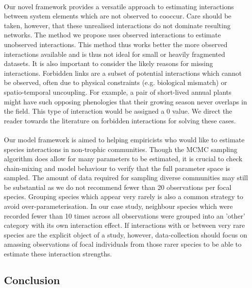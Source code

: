 \documentclass[a4,12pt]{article}
\begin{document}
        \paragraph{}
        Our novel framework provides a versatile approach to estimating interactions between system elements which are not observed to cooccur. Care should be taken, however, that these unrealised interactions do not dominate resulting networks. The method we propose uses observed interactions to estimate unobserved interactions. This method thus works better the more observed interactions available and is thus not ideal for small or heavily fragmented datasets. It is also important to consider the likely reasons for missing interactions. Forbidden links are a subset of potential interactions which cannot be observed, often due to physical constraints (e.g. biological mismatch) or spatio-temporal uncoupling. For example, a pair of short-lived annual plants might have such opposing phenologies that their growing season never overlaps in the field. This type of interaction would be assigned a 0 value. We direct the reader towards the literature on forbidden interactions \parencite{Olesen2011, Jordano2016} for solving these cases. 

        \paragraph{}
        Our model framework is aimed to helping empiricists who would like to estimate species interactions in non-trophic communities. Though the MCMC sampling algorithm does allow for many parameters to be estimated, it is crucial to check chain-mixing and model behaviour to verify that the full parameter space is sampled. The amount of data required for sampling diverse communities may still be substantial as we do not recommend fewer than 20 observations per focal species. Grouping species which appear very rarely is also a common strategy to avoid over-parameterisation. In our case study, neighbour species which were recorded fewer than 10 times across all observations were grouped into an 'other' category with its own interaction effect. If interactions with or between very rare species are the explicit object of a study, however, data-collection should focus on amassing observations of focal individuals from those rarer species to be able to estimate these interaction strengths.   

\subsection{Conclusion}
\end{document}
